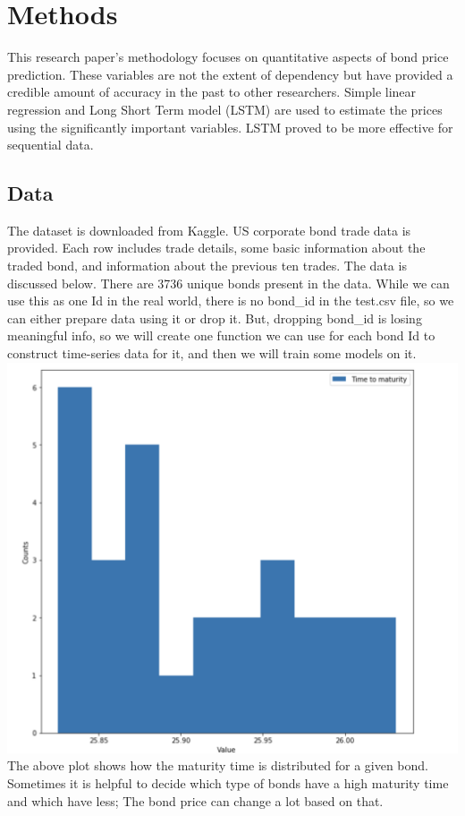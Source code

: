 \documentclass[
  man]{apa6}
\begin{document}
\hypertarget{methods}{%
\section{Methods}\label{methods}}

This research paper's methodology focuses on quantitative aspects of bond price prediction. These variables are not the extent of dependency but have provided a credible amount of accuracy in the past to other researchers. Simple linear regression and Long Short Term model (LSTM) are used to estimate the prices using the significantly important variables. LSTM proved to be more effective for sequential data.

\hypertarget{data}{%
\subsection{Data}\label{data}}

The dataset is downloaded from Kaggle. US corporate bond trade data is provided. Each row includes trade details, some basic information about the traded bond, and information about the previous ten trades. The data is discussed below. There are 3736 unique bonds present in the data. While we can use this as one Id in the real world, there is no bond\_id in the test.csv file, so we can either prepare data using it or drop it. But, dropping bond\_id is losing meaningful info, so we will create one function we can use for each bond Id to construct time-series data for it, and then we will train some models on it.
\includegraphics{timeTomaturity.png}
The above plot shows how the maturity time is distributed for a given bond. Sometimes it is helpful to decide which type of bonds have a high maturity time and which have less; The bond price can change a lot based on that.
\end{document}
